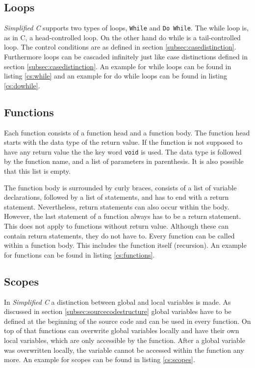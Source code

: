 \documentclass[12pt,a4paper,titlepage,oneside,final]{article}
\begin{document}


\subsection{Loops}
\emph{Simplified C} supports two types of loops, \texttt{While} and \texttt{Do While}. The while loop is, as in C, a head-controlled loop. On the other hand do while is a tail-controlled loop. The control conditions are as defined in section \vref{subsec:casedistinction}. Furthermore loops can be cascaded infinitely just like case distinctions defined in section \vref{subsec:casedistinction}. An example for while loops can be found in listing \vref{cs:while} and an example for do while loops can be found in listing \vref{cs:dowhile}.





\subsection{Functions}
Each function consists of a function head and a function body. The function head starts with the data type of the return value. If the function is not supposed to have any return value the the key word \texttt{void} is used. The data type is followed by the function name, and a list of parameters in parenthesis. It is also possible that this list is empty.

The function body is surrounded by curly braces, consists of a list of variable declarations, followed by a list of statements, and has to end with a return statement. Nevertheless, return statements can also occur within the body. However, the last statement of a function always has to be a return statement. This does not apply to functions without return value. Although these can contain return statements, they do not have to. Every function can be called within a function body. This includes the function itself (recursion). An example for functions can be found in listing \vref{cs:functions}.



\subsection{Scopes}
In \emph{Simplified C} a distinction between global and local variables is made. As discussed in section \vref{subsec:sourcecodestructure} global variables have to be defined at the beginning of the source code and can be used in every function. On top of that functions can overwrite global variables locally and have their own local variables, which are only accessible by the function. After a global variable was overwritten locally, the variable cannot be accessed within the function any more. An example for scopes can be found in listing \vref{cs:scopes}.
\end{document}
